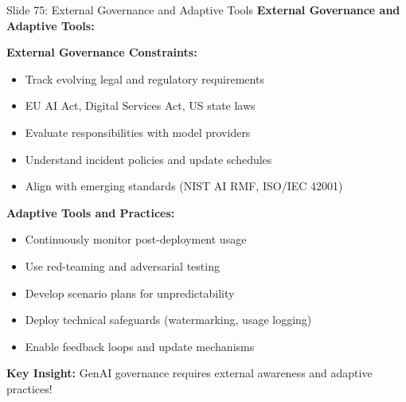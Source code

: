 \documentclass[8pt]{beamer}
\begin{document}
	\begin{frame}{Slide 75: External Governance and Adaptive Tools}
		\fontsize{6.5}{7.5}\selectfont
		\textbf{External Governance and Adaptive Tools:}
		
		\vspace{0.1cm}
		\textbf{External Governance Constraints:}
		\begin{itemize}
			\item Track evolving legal and regulatory requirements
			\item EU AI Act, Digital Services Act, US state laws
			\item Evaluate responsibilities with model providers
			\item Understand incident policies and update schedules
			\item Align with emerging standards (NIST AI RMF, ISO/IEC 42001)
		\end{itemize}
		
		\vspace{0.1cm}
		\textbf{Adaptive Tools and Practices:}
		\begin{itemize}
			\item Continuously monitor post-deployment usage
			\item Use red-teaming and adversarial testing
			\item Develop scenario plans for unpredictability
			\item Deploy technical safeguards (watermarking, usage logging)
			\item Enable feedback loops and update mechanisms
		\end{itemize}
		
		\textcolor{myblue}{\textbf{Key Insight:}} GenAI governance requires \textcolor{myblue}{external awareness and adaptive practices}!
	\end{frame}
	
	
\end{document}
